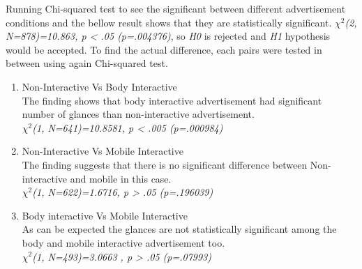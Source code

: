 \begin{table}[H]
\caption{Cross tabulation for each week attention level }
\label{tab:crosstabulationweeks}
\centering
{}
\end{table}



Running Chi-squared test to see the significant between different advertisement conditions and the bellow result shows that they are statistically significant.
${\chi}^2$\emph{(2, N=878)=10.863, p < .05 (p=.004376)}, so \emph{H0} is rejected and \emph{H1} hypothesis would be accepted.
To find the actual difference, each pairs were tested in between using again Chi-squared test.

\begin{enumerate}
\item Non-Interactive Vs Body Interactive \\
The finding shows that body interactive advertisement had significant number of glances than non-interactive advertisement. \\
${\chi}^2$\emph{(1, N=641)=10.8581, p < .005 (p=.000984)}

\item Non-Interactive Vs Mobile Interactive  \\
The finding suggests that there is no significant difference between Non-interactive and mobile in this case.\\
${\chi}^2$\emph{(1, N=622)=1.6716, p > .05 (p=.196039)}

\item Body interactive Vs Mobile Interactive \\
As can be expected the glances are not statistically significant among the body and mobile interactive advertisement too.\\
${\chi}^2$\emph{(1, N=493)=3.0663 , p > .05 (p=.07993)}

\end{enumerate}



